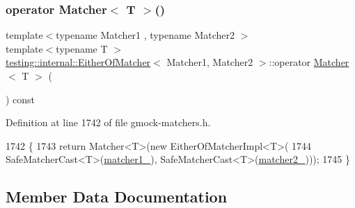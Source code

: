 \mbox{\label{classtesting_1_1internal_1_1EitherOfMatcher_aef76a8b45451ec7abf845a2b9dd74bfb}} 
\subsubsection{\texorpdfstring{operator Matcher$<$ T $>$()}{operator Matcher< T >()}}
{\footnotesize\ttfamily template$<$typename Matcher1 , typename Matcher2 $>$ \\
template$<$typename T $>$ \\
\hyperlink{classtesting_1_1internal_1_1EitherOfMatcher}{testing\+::internal\+::\+Either\+Of\+Matcher}$<$ Matcher1, Matcher2 $>$\+::operator \hyperlink{classtesting_1_1Matcher}{Matcher}$<$ T $>$ (\begin{DoxyParamCaption}{ }\end{DoxyParamCaption}) const\hspace{0.3cm}{\ttfamily [inline]}}



Definition at line 1742 of file gmock-\/matchers.\+h.


\begin{DoxyCode}
1742                               \{
1743     \textcolor{keywordflow}{return} Matcher<T>(\textcolor{keyword}{new} EitherOfMatcherImpl<T>(
1744         SafeMatcherCast<T>(\hyperlink{classtesting_1_1internal_1_1EitherOfMatcher_a335b19a187644e6057f0046a2e6949cf}{matcher1\_}), SafeMatcherCast<T>(\hyperlink{classtesting_1_1internal_1_1EitherOfMatcher_a4c8a80860b5748dfb764744a8aae6a90}{matcher2\_})));
1745   \}
\end{DoxyCode}


\subsection{Member Data Documentation}
\mbox{\label{classtesting_1_1internal_1_1EitherOfMatcher_a335b19a187644e6057f0046a2e6949cf}} 

